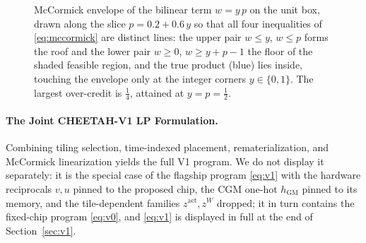 \begin{figure}[h!]
\centering
{}
\caption{McCormick envelope of the bilinear term $w = y\,p$ on the unit box, drawn along the slice $p = 0.2 + 0.6\,y$ so that all four inequalities of \eqref{eq:mccormick} are distinct lines: the upper pair $w \le y$, $w \le p$ forms the roof and the lower pair $w \ge 0$, $w \ge y + p - 1$ the floor of the shaded feasible region, and the true product (blue) lies inside, touching the envelope only at the integer corners $y \in \{0,1\}$. The largest over-credit is $\tfrac14$, attained at $y = p = \tfrac12$.}
\label{fig:mccormick}
\end{figure}
\paragraph{The Joint CHEETAH-V1 LP Formulation.}
Combining tiling selection, time-indexed placement, rematerialization, and McCormick linearization yields the full V1 program. We do not display it separately: it is the special case of the flagship program \eqref{eq:v1} with the hardware reciprocals $v,u$ pinned to the proposed chip, the CGM one-hot $h_{\mathrm{GM}}$ pinned to its memory, and the tile-dependent families $z^{\mathrm{act}}, z^{W}$ dropped; it in turn contains the fixed-chip program \eqref{eq:v0}, and \eqref{eq:v1} is displayed in full at the end of Section~\ref{sec:v1}.

